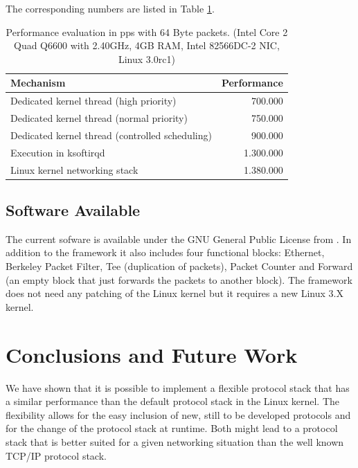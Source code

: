 \documentclass{sig-alternate}
\begin{document}
The corresponding numbers are listed in Table \ref{tab:performance}.
\begin{table}[htb]
\begin{tabular}{ l r }
Mechanism & Performance\\
\hline
Dedicated kernel thread (high priority) & 700.000\\
Dedicated kernel thread (normal priority) & 750.000\\
Dedicated kernel thread (controlled scheduling) & 900.000\\
Execution in ksoftirqd & 1.300.000\\
Linux kernel networking stack & 1.380.000\\
\end{tabular}
\caption{Performance evaluation in pps with 64 Byte packets.
(Intel Core 2 Quad Q6600 with 2.40GHz, 4GB RAM, Intel 82566DC-2 NIC, Linux 3.0rc1)}
\label{tab:performance}
\end{table}

\subsection{Software Available}
The current sofware is available under the GNU General Public License from 
\cite{lana}. In addition to the framework it also includes four functional 
blocks: Ethernet, Berkeley Packet Filter, Tee (duplication of packets), Packet 
Counter and Forward (an empty block that just forwards the packets to 
another block). The framework does not need any patching of the Linux kernel
but it requires a new Linux 3.X kernel.

\section{Conclusions and Future Work}
We have shown that it is possible to implement a flexible protocol stack that has a similar performance than the default protocol stack in the Linux kernel. The flexibility allows for the easy inclusion of new, still to be developed protocols and for the change of the protocol stack at runtime. Both might lead to a protocol stack that is better suited for a given networking situation than the well known TCP/IP protocol stack.
\end{document}
